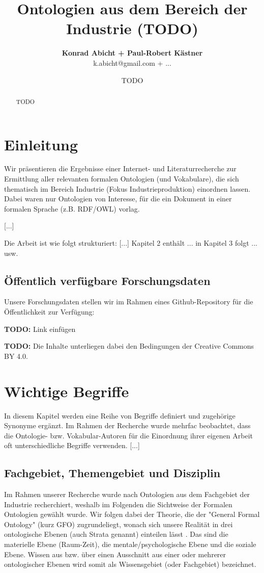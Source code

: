\documentclass{article}
\title{Ontologien aus dem Bereich der Industrie (TODO)}
\author{\textbf{Konrad Abicht + Paul-Robert Kästner} \\ k.abicht@gmail.com + ...}
\date{TODO}
\begin{document}
\maketitle

\begin{abstract}
    TODO
\end{abstract}

\section{Einleitung}

Wir präsentieren die Ergebnisse einer Internet- und Literaturrecherche zur Ermittlung aller relevanten formalen Ontologien (und Vokabulare), die sich thematisch im Bereich Industrie (Fokus Industrieproduktion) einordnen lassen.
Dabei waren nur Ontologien von Interesse, für die ein Dokument in einer formalen Sprache (z.B. RDF/OWL) vorlag.

[...]

Die Arbeit ist wie folgt strukturiert: [...] Kapitel 2 enthält ... in Kapitel 3 folgt ... usw.

\subsection{Öffentlich verfügbare Forschungsdaten}

Unsere Forschungsdaten stellen wir im Rahmen eines Github-Repository für die Öffentlichkeit zur Verfügung:

\textbf{TODO:} Link einfügen

\textbf{TODO:} Die Inhalte unterliegen dabei den Bedingungen der Creative Commons BY 4.0.

\section{Wichtige Begriffe}

In diesem Kapitel werden eine Reihe von Begriffe definiert und zugehörige Synonyme ergänzt.
Im Rahmen der Recherche wurde mehrfac beobachtet, dass die Ontologie- bzw. Vokabular-Autoren für die Einordnung ihrer eigenen Arbeit oft unterschiedliche Begriffe verwenden.
[...]

\subsection{Fachgebiet, Themengebiet und Disziplin}

Im Rahmen unserer Recherche wurde nach Ontologien aus dem Fachgebiet der Industrie recherchiert, weshalb im Folgenden die Sichtweise der Formalen Ontologien gewählt wurde.
Wir folgen dabei der Theorie, die der "General Formal Ontology" (kurz GFO) zugrundeliegt, wonach sich unsere Realität in drei ontologische Ebenen (auch Strata genannt) einteilen lässt \cite{herre2006general}.
Das sind die materielle Ebene (Raum-Zeit), die mentale/psychologische Ebene und die soziale Ebene.
Wissen aus bzw. über einen Ausschnitt aus einer oder mehrerer ontologischer Ebenen wird somit als Wissensgebiet (oder Fachgebiet) bezeichnet.
\end{document}
